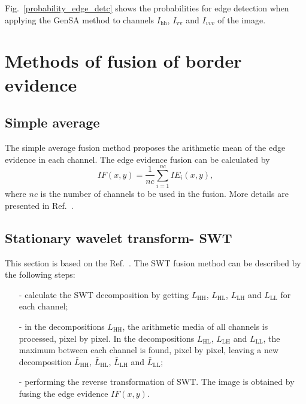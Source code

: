 \documentclass[conference]{IEEEtran}
\begin{document}
Fig.~\ref{probability_edge_detc} shows the probabilities for edge detection when applying the GenSA method to channels $I_\text{hh}$, $I_\text{vv}$ and $I_{vvv}$ of the image. 
\section{Methods of fusion of border evidence}\label{sec_07}
\subsection{Simple average}
The simple average fusion method proposes the arithmetic mean of the edge evidence in each channel. The edge evidence fusion can be calculated by
\begin{equation}
	IF(x,y)=\frac{1}{nc}\sum_{i=1}^{nc}IE_i(x,y),
\end{equation}
where $nc$ is the number of channels to be used in the fusion. More details are presented in Ref.~\cite{mit}.
\subsection{Stationary wavelet transform- SWT} 
This section is based on the Ref.~\cite{n_r}. The SWT fusion method can be described by the following steps:
\begin{itemize}
\item[-] calculate the SWT decomposition by getting $L_\text{HH}$, $L_\text{HL}$, $L_\text{LH}$ and $L_\text{LL}$ for each channel;
\item[-] in the decompositions $L_\text{HH}$, the arithmetic media of all channels is processed, pixel by pixel. In the decompositions $L_\text{HL}$, $L_\text{LH}$ and $L_\text{LL}$, the maximum between each channel is found, pixel by pixel, leaving a new decomposition $\bar{L}_\text{HH}$, $\bar{L}_\text{HL}$, $\bar{L}_\text{LH}$ and $\bar{L}_\text{LL}$;
\item[-] performing the reverse transformation of SWT. The image is obtained by fusing the edge evidence $IF(x,y)$.  
\end{itemize}
\end{document}

